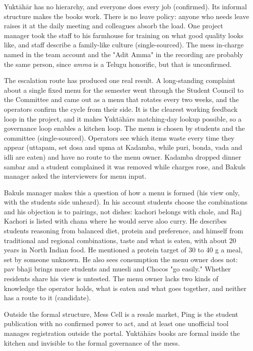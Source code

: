 \documentclass[
  10pt,
  table]{article}
\begin{document}
Yuktāhār has no hierarchy, and everyone does every job (confirmed). Its informal structure makes the books work. There is no leave policy: anyone who needs leave raises it at the daily meeting and colleagues absorb the load. One project manager took the staff to his farmhouse for training on what good quality looks like, and staff describe a family-like culture (single-sourced). The mess in-charge named in the team account and the "Adit Amma" in the recording are probably the same person, since \emph{amma} is a Telugu honorific, but that is unconfirmed.

The escalation route has produced one real result. A long-standing complaint about a single fixed menu for the semester went through the Student Council to the Committee and came out as a menu that rotates every two weeks, and the operators confirm the cycle from their side. It is the clearest working feedback loop in the project, and it makes Yuktāhār\textquotesingle s matching-day lookup possible, so a governance loop enables a kitchen loop. The menu is chosen by students and the committee (single-sourced). Operators see which items waste every time they appear (uttapam, set dosa and upma at Kadamba, while puri, bonda, vada and idli are eaten) and have no route to the menu owner. Kadamba dropped dinner sambar and a student complained it was removed while charges rose, and Bakul\textquotesingle s manager asked the interviewers for menu input.

Bakul\textquotesingle s manager makes this a question of how a menu is formed (his view only, with the students\textquotesingle{} side unheard). In his account students choose the combinations and his objection is to pairings, not dishes: kachori belongs with chole, and Raj Kachori is listed with chana where he would serve aloo curry. He describes students reasoning from balanced diet, protein and preference, and himself from traditional and regional combinations, taste and what is eaten, with about 20 years in North Indian food. He mentioned a protein target of 30 to 40 g a meal, set by someone unknown. He also sees consumption the menu owner does not: pav bhaji brings more students and muesli and Chocos "go easily." Whether residents share his view is untested. The menu owner lacks two kinds of knowledge the operator holds, what is eaten and what goes together, and neither has a route to it (candidate).

Outside the formal structure, Mess Cell is a resale market, Ping is the student publication with no confirmed power to act, and at least one unofficial tool manages registration outside the portal. Yuktāhār\textquotesingle s books are formal inside the kitchen and invisible to the formal governance of the mess.
\end{document}
